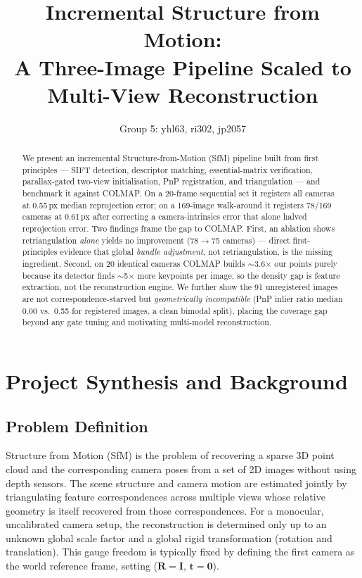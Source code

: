 \documentclass{article} %
\title{Incremental Structure from Motion: \\ A Three-Image Pipeline Scaled to Multi-View Reconstruction}
\author{Group 5: yhl63, ri302, jp2057}
\begin{document}
\maketitle

\begin{abstract}
We present an incremental Structure-from-Motion (SfM) pipeline built from first
principles --- SIFT detection, descriptor matching, essential-matrix verification,
parallax-gated two-view initialisation, PnP registration, and triangulation --- and
benchmark it against COLMAP. On a 20-frame sequential set it registers all cameras
at \mbox{0.55\,px} median reprojection error; on a 169-image walk-around it registers
\mbox{78/169} cameras at \mbox{0.61\,px} after correcting a camera-intrinsics error
that alone halved reprojection error. Two findings frame the gap to COLMAP. First,
an ablation shows retriangulation \emph{alone} yields no improvement
(\mbox{78$\to$75} cameras) --- direct first-principles evidence that global
\emph{bundle adjustment}, not retriangulation, is the missing ingredient. Second, on
20 identical cameras COLMAP builds $\sim$3.6$\times$ our points purely because its
detector finds $\sim$5$\times$ more keypoints per image, so the density gap is
feature extraction, not the reconstruction engine. We further show the 91
unregistered images are not correspondence-starved but
\emph{geometrically incompatible} (PnP inlier ratio median 0.00 vs.\ 0.55 for
registered images, a clean bimodal split), placing the coverage gap beyond any gate
tuning and motivating multi-model reconstruction.
\end{abstract}

\section{Project Synthesis and Background}

\subsection{Problem Definition}
Structure from Motion (SfM) is the problem of recovering a sparse 3D point cloud and the corresponding camera poses 
from a set of 2D images without using depth sensors. The scene structure and camera motion are estimated jointly by 
triangulating feature correspondences across multiple views whose relative geometry is itself recovered from those 
correspondences. For a monocular, uncalibrated camera setup, the reconstruction is determined only up to an unknown 
global scale factor and a global rigid transformation (rotation and translation). This gauge freedom is typically 
fixed by defining the first camera as the world reference frame, setting ($\mathbf{R}=\mathbf{I}$,
$\mathbf{t}=\mathbf{0}$).
\end{document}

